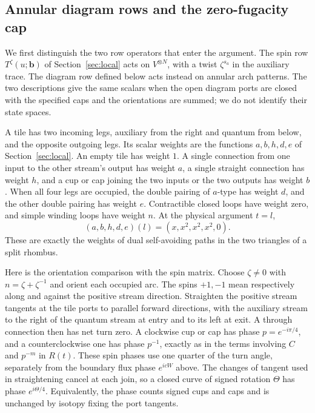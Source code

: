\subsection{Annular diagram rows and the zero-fugacity cap}

We first distinguish the two row operators that enter the argument.
The spin row \(T^\zeta(u;\mathbf b)\) of Section~\ref{sec:local} acts on
\(V^{\otimes N}\), with a twist \(\zeta^{s_a}\) in the auxiliary trace.
The diagram row defined below acts instead on annular arch patterns.
The two descriptions give the same scalars when the open diagram ports
are closed with the specified caps and the orientations are summed;
we do not identify their state spaces.

A tile has two incoming legs, auxiliary from the right and quantum
from below, and the opposite outgoing legs.  Its scalar weights are
the functions \(a,b,h,d,e\) of Section~\ref{sec:local}.  An empty tile
has weight \(1\).  A single connection from one input to the other
stream's output has weight \(a\), a single straight connection has
weight \(h\), and a cup or cap joining the two inputs or the two
outputs has weight \(b\).  When all four legs are occupied, the
double pairing of \(a\)-type has weight \(d\), and the other double
pairing has weight \(e\).  Contractible closed loops have weight zero,
and simple winding loops have weight \(n\).  At the physical argument
\(t=l\),
\[
 (a,b,h,d,e)(l)=(x,x^2,x^2,x^2,0).
\]
These are exactly the weights of dual self-avoiding paths in the two
triangles of a split rhombus.

Here is the orientation comparison with the spin matrix.  Choose
\(\zeta\ne0\) with \(n=\zeta+\zeta^{-1}\) and orient each occupied
arc.  The spins \(+1,-1\) mean respectively along and against the
positive stream direction.  Straighten the positive stream tangents
at the tile ports to parallel forward directions, with the auxiliary
stream to the right of the quantum stream at entry and to its left
at exit.  A through connection then has net turn zero.  A clockwise
cup or cap has phase \(p=e^{-i\pi/4}\), and a counterclockwise one has
phase \(p^{-1}\), exactly as in the terms involving \(C\) and
\(p^{-m}\) in \(R(t)\).  These spin phases use one quarter of the turn
angle, separately from the boundary flux phase \(e^{icW}\) above.
The changes of tangent used in straightening cancel at each join, so
a closed curve of signed rotation \(\Theta\) has phase
\(e^{i\Theta/4}\).  Equivalently, the phase counts signed cups and
caps and is unchanged by isotopy fixing the port tangents.

